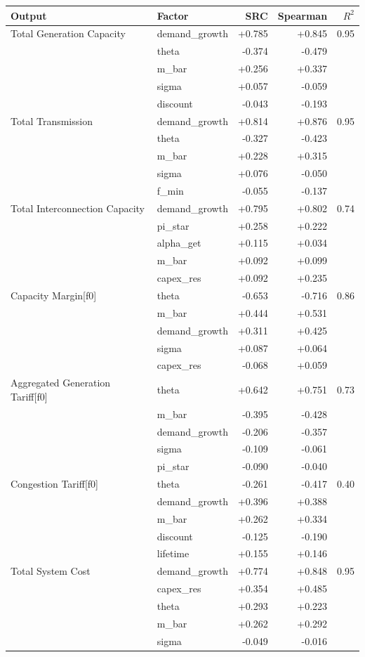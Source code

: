 \begin{tabular}{@{}llrrr@{}}
\toprule
Output & Factor & SRC & Spearman & $R^2$\\
\midrule
Total Generation Capacity & demand_growth & +0.785 & +0.845 & 0.95\\
 & theta & -0.374 & -0.479 & \\
 & m_bar & +0.256 & +0.337 & \\
 & sigma & +0.057 & -0.059 & \\
 & discount & -0.043 & -0.193 & \\
\addlinespace
Total Transmission & demand_growth & +0.814 & +0.876 & 0.95\\
 & theta & -0.327 & -0.423 & \\
 & m_bar & +0.228 & +0.315 & \\
 & sigma & +0.076 & -0.050 & \\
 & f_min & -0.055 & -0.137 & \\
\addlinespace
Total Interconnection Capacity & demand_growth & +0.795 & +0.802 & 0.74\\
 & pi_star & +0.258 & +0.222 & \\
 & alpha_get & +0.115 & +0.034 & \\
 & m_bar & +0.092 & +0.099 & \\
 & capex_res & +0.092 & +0.235 & \\
\addlinespace
Capacity Margin[f0] & theta & -0.653 & -0.716 & 0.86\\
 & m_bar & +0.444 & +0.531 & \\
 & demand_growth & +0.311 & +0.425 & \\
 & sigma & +0.087 & +0.064 & \\
 & capex_res & -0.068 & +0.059 & \\
\addlinespace
Aggregated Generation Tariff[f0] & theta & +0.642 & +0.751 & 0.73\\
 & m_bar & -0.395 & -0.428 & \\
 & demand_growth & -0.206 & -0.357 & \\
 & sigma & -0.109 & -0.061 & \\
 & pi_star & -0.090 & -0.040 & \\
\addlinespace
Congestion Tariff[f0] & theta & -0.261 & -0.417 & 0.40\\
 & demand_growth & +0.396 & +0.388 & \\
 & m_bar & +0.262 & +0.334 & \\
 & discount & -0.125 & -0.190 & \\
 & lifetime & +0.155 & +0.146 & \\
\addlinespace
Total System Cost & demand_growth & +0.774 & +0.848 & 0.95\\
 & capex_res & +0.354 & +0.485 & \\
 & theta & +0.293 & +0.223 & \\
 & m_bar & +0.262 & +0.292 & \\
 & sigma & -0.049 & -0.016 & \\
\bottomrule
\end{tabular}
